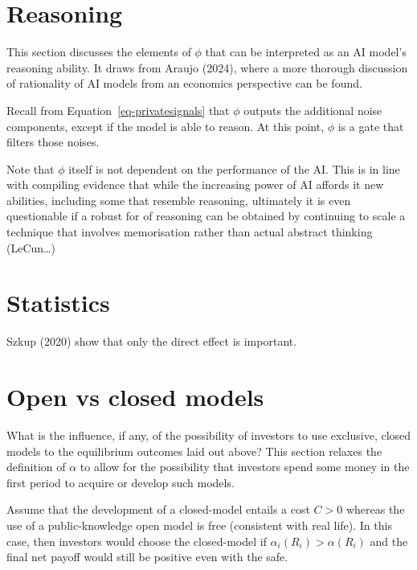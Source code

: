 \documentclass[
]{article}
\theoremstyle{plain}
\theoremstyle{remark}
\begin{document}
\hypertarget{sec-reasoning}{%
\section{Reasoning}\label{sec-reasoning}}

This section discusses the elements of \(\phi\) that can be interpreted
as an AI model's reasoning ability. It draws from Araujo (2024), where a
more thorough discussion of rationality of AI models from an economics
perspective can be found.

Recall from Equation~\ref{eq-privatesignals} that \(\phi\) outputs the
additional noise components, except if the model is able to reason. At
this point, \(\phi\) is a gate that filters those noises.

Note that \(\phi\) itself is not dependent on the performance of the AI.
This is in line with compiling evidence that while the increasing power
of AI affords it new abilities, including some that resemble reasoning,
ultimately it is even questionable if a robust for of reasoning can be
obtained by continuing to scale a technique that involves memorisation
rather than actual abstract thinking (LeCun\ldots)

\hypertarget{statistics}{%
\section{Statistics}\label{statistics}}

Szkup (2020) show that only the direct effect is important.

\hypertarget{sec-closedmodels}{%
\section{Open vs closed models}\label{sec-closedmodels}}

What is the influence, if any, of the possibility of investors to use
exclusive, closed models to the equilibrium outcomes laid out above?
This section relaxes the definition of \(\alpha\) to allow for the
possibility that investors spend some money in the first period to
acquire or develop such models.

Assume that the development of a closed-model entails a cost \(C > 0\)
whereas the use of a public-knowledge open model is free (consistent
with real life). In this case, then investors would choose the
closed-model if \(\alpha_i(R_i) > \alpha(R_i)\) and the final net payoff
would still be positive even with the safe.
\end{document}
